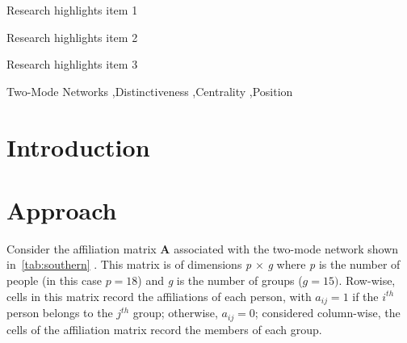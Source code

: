 \documentclass[a4paper,fleqn]{cas-sc}
\begin{document}
\begin{abstract}
This template helps you to create a properly formatted \LaTeX\ manuscript.

\noindent\texttt{\textbackslash begin{abstract}} \dots 
\texttt{\textbackslash end{abstract}} and
\verb+\begin{keyword}+ \verb+...+ \verb+\end{keyword}+ 
which
contain the abstract and keywords respectively. 

\noindent Each keyword shall be separated by a \verb+\sep+ command.
\end{abstract}


\begin{highlights}
\item Research highlights item 1
\item Research highlights item 2
\item Research highlights item 3
\end{highlights}

\begin{keywords}
Two-Mode Networks  \sep Distinctiveness \sep Centrality \sep Position
\end{keywords}


\maketitle

\section{Introduction}


\section{Approach}
Consider the affiliation matrix $\mathbf{A}$ associated with the two-mode network shown in~\ref{tab:southern} \citep{davis1941}. This matrix is of dimensions \textit{p} $\times$ \textit{g} where \textit{p} is the number of people (in this case $p = 18$) and \textit{g} is the number of groups ($g = 15)$. Row-wise, cells in this matrix record the affiliations of each person, with $a_{ij} = 1$ if the $i^{th}$ person belongs to the $j^{th}$ group; otherwise, $a_{ij} = 0$; considered column-wise, the cells of the affiliation matrix record the members of each group. 
\end{document}
